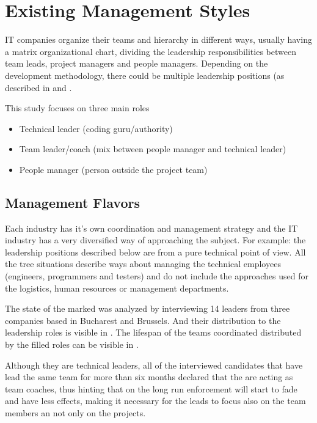 \chapter{Existing Management Styles}
\label{chapter:existing}
IT companies  organize their teams and hierarchy in different ways, usually having a matrix organizational chart, dividing the leadership responsibilities between team leads, project managers and people managers. Depending on the development methodology, there could be multiple leadership positions (as described in \cite{abur-tl} and \cite{abur-pm}.

This study focuses on three main roles
\begin{itemize}
\item Technical leader (coding guru/authority)
\item Team leader/coach (mix between people manager and technical leader)
\item People manager (person outside the project team)

\end{itemize}
\section{Management Flavors}
\label{sec:flavours}
Each industry has it's own coordination and management strategy and the IT industry has a very diversified way of approaching the subject. For example: the leadership positions described below are from a pure technical point of view. All the tree situations describe ways about managing the technical employees (engineers, programmers and testers) and do not include the approaches used for the logistics, human resources or management departments.

The state of the marked was analyzed by interviewing 14 leaders from three companies based in Bucharest and Brussels. And their distribution to the leadership roles is visible in . The lifespan of the teams coordinated distributed by the filled roles can be visible in .

 
Although they are technical leaders, all of the interviewed candidates that have lead the same team for more than six months declared that the are acting as team coaches, thus  hinting that on the long run enforcement will start to fade and have less effects, making it necessary for the leads to focus also on the team members an not only on the projects.

